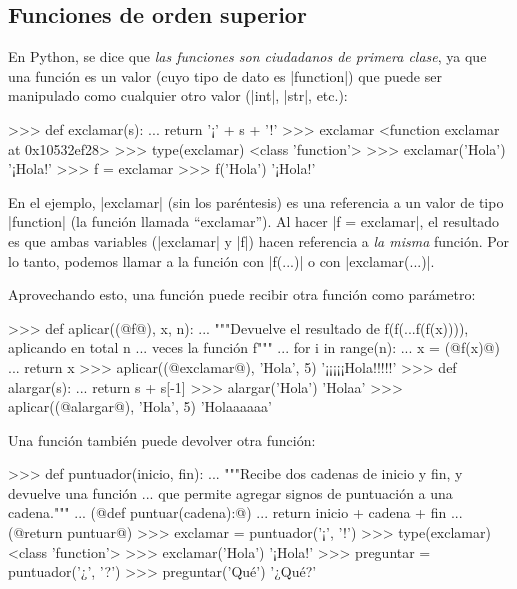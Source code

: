 \newpage
\begin{subappendices}
\section{Funciones de orden superior}
\label{map-filter}

En Python, se dice que \emph{las funciones son ciudadanos de primera clase}, ya
que una función es un valor (cuyo tipo de dato es |function|) que puede ser
manipulado como cualquier otro valor (|int|, |str|, etc.):

\begin{codigo-python-sn}
>>> def exclamar(s):
...     return '¡' + s + '!'
>>> exclamar
<function exclamar at 0x10532ef28>
>>> type(exclamar)
<class 'function'>
>>> exclamar('Hola')
'¡Hola!'
>>> f = exclamar
>>> f('Hola')
'¡Hola!'
\end{codigo-python-sn}

En el ejemplo, |exclamar| (sin los paréntesis) es una referencia a un valor de
tipo |function| (la función llamada ``exclamar''). Al hacer |f = exclamar|,
el resultado es que ambas variables (|exclamar| y |f|) hacen referencia a
\emph{la misma} función. Por lo tanto, podemos llamar a la función con
|f(...)| o con |exclamar(...)|.

Aprovechando esto, una función puede recibir otra función como parámetro:

\begin{codigo-python-sn}
>>> def aplicar((@f@), x, n):
...     """Devuelve el resultado de f(f(...f(f(x)))), aplicando en total n
...        veces la función f"""
...     for i in range(n):
...         x = (@f(x)@)
...     return x
>>> aplicar((@exclamar@), 'Hola', 5)
'¡¡¡¡¡Hola!!!!!'
>>> def alargar(s):
...     return s + s[-1]
>>> alargar('Hola')
'Holaa'
>>> aplicar((@alargar@), 'Hola', 5)
'Holaaaaaa'
\end{codigo-python-sn}

Una función también puede devolver otra función:

\begin{codigo-python-sn}
>>> def puntuador(inicio, fin):
...    """Recibe dos cadenas de inicio y fin, y devuelve una función
...       que permite agregar signos de puntuación a una cadena."""
...    (@def puntuar(cadena):@)
...        return inicio + cadena + fin
...    (@return puntuar@)
>>> exclamar = puntuador('¡', '!')
>>> type(exclamar)
<class 'function'>
>>> exclamar('Hola')
'¡Hola!'
>>> preguntar = puntuador('¿', '?')
>>> preguntar('Qué')
'¿Qué?'
\end{codigo-python-sn}


\end{subappendices}
